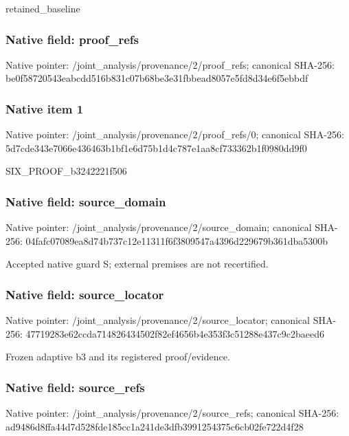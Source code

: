 \documentclass[10pt,a4paper]{article}
\begin{document}
\begingroup\raggedright\sloppy retained\_\allowbreak{}baseline\par\endgroup

\subsubsection{Native field: proof\_\allowbreak{}refs}
Native pointer: /joint\_\allowbreak{}analysis/provenance/2/proof\_\allowbreak{}refs; canonical SHA-256: be0f58720543eabcdd516b831c07b68be3e31fbbead8057e5fd8d34e6f5ebbdf

\subsubsection{Native item 1}
Native pointer: /joint\_\allowbreak{}analysis/provenance/2/proof\_\allowbreak{}refs/0; canonical SHA-256: 5d7cde343e7066e436463b1bf1e6d75b1d4c787e1aa8cf733362b1f0980dd9f0

\begingroup\raggedright\sloppy SIX\_\allowbreak{}PROOF\_\allowbreak{}b3242221f506\par\endgroup

\subsubsection{Native field: source\_\allowbreak{}domain}
Native pointer: /joint\_\allowbreak{}analysis/provenance/2/source\_\allowbreak{}domain; canonical SHA-256: 04fafc07089ea8d74b737c12e11311f6f3809547a4396d229679b361dba5300b

\begingroup\raggedright\sloppy Accepted native guard S;\allowbreak{} external premises are not recertified.\par\endgroup

\subsubsection{Native field: source\_\allowbreak{}locator}
Native pointer: /joint\_\allowbreak{}analysis/provenance/2/source\_\allowbreak{}locator; canonical SHA-256: 47719283e62ccda714826434502f82ef4656b4e353f3c51288e437c9c2baeed6

\begingroup\raggedright\sloppy Frozen adaptive b3 and its registered proof/\allowbreak{}evidence.\par\endgroup

\subsubsection{Native field: source\_\allowbreak{}refs}
Native pointer: /joint\_\allowbreak{}analysis/provenance/2/source\_\allowbreak{}refs; canonical SHA-256: ad9486d8ffa44d7d528fde185cc1a241de3dfb3991254375c6cb02fe722d4f28
\end{document}
